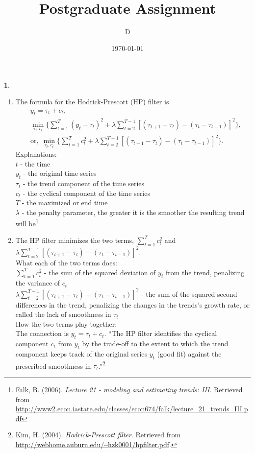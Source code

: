 \documentclass[10pt]{article}
\author{D}
\newtheorem{prob}{\bm{$Problem$}}
\begin{document}
\title{Postgraduate Assignment}
\date{\today}
\maketitle
\thispagestyle{fancy}
\thispagestyle{fancy}

\begin{prob}
\end{prob}
\begin{enumerate}[1)]
\vspace{3mm}

\item
The formula for the Hodrick-Prescott (HP) filter is
\begin{align*}
&y_t=\tau_t+c_t,\\
&\min_{\tau_t, c_t}\{\sum^T_{t=1}(y_t-\tau_t)^2+\lambda\sum^{T-1}_{t=2}[(\tau_{t+1}-\tau_t)-(\tau_t-\tau_{t-1})]^2\},\\
&\textrm{or},\;\min_{\tau_t, c_t}\{\sum^T_{t=1}c_t^2+\lambda\sum^{T-1}_{t=2}[(\tau_{t+1}-\tau_t)-(\tau_t-\tau_{t-1})]^2\}.
\end{align*}
Explanations:\\
$t$ - the time\\
$y_t$ - the original time series\\
$\tau_t$ - the trend component of the time series\\
$c_t$ - the cyclical component of the time series\\
$T$ - the maximized or end time\\
$\lambda$ - the penalty parameter, the greater it is the smoother the resulting trend will be\footnote{ Falk, B. (2006). \textit{Lecture 21 - modeling and estimating trends: III}. Retrieved from \url{http://www2.econ.iastate.edu/classes/econ674/falk/lecture_21_trends_III.pdf}}
\vspace{3mm}

\item
The HP filter minimizes the two terms, $\sum^T_{t=1}c_t^2$ and $\lambda\sum^{T-1}_{t=2}[(\tau_{t+1}-\tau_t)-(\tau_t-\tau_{t-1})]^2$.\\
What each of the two terms does:\\
$\sum^T_{t=1}c_t^2$ - the sum of the squared deviation of $y_t$ from the trend, penalizing the variance of $c_t$\\ %
$\lambda\sum^{T-1}_{t=2}[(\tau_{t+1}-\tau_t)-(\tau_t-\tau_{t-1})]^2$ - the sum of the squared second differences in the trend, penalizing the changes in the trends's growth rate, or called the lack of smoothness in $\tau_t$\\
How the two terms play together:\\
The connection is $y_t=\tau_t+c_t$. ``The HP filter identifies the cyclical component $c_t$ from $y_t$ by the trade-off to the extent to which the trend component keeps track of the original series $y_t$ (good fit) against the prescribed smoothness in $\tau_t$.''\footnote{ Kim, H. (2004). \textit{Hodrick-Prescott filter}. Retrieved from \url{http://webhome.auburn.edu/~hzk0001/hpfilter.pdf}.}
\vspace{3mm}


\end{enumerate}
\end{document}
